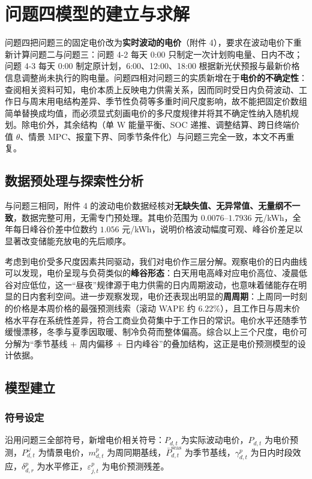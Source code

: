 \section{问题四模型的建立与求解}

问题四把问题三的固定电价改为\textbf{实时波动的电价}（附件 4），要求在波动电价下重新计算问题二与问题三：问题 4-2 每天 0:00 只制定一次计划购电量、日内不改；问题 4-3 每天 0:00 制定原计划，6:00、12:00、18:00 根据新光伏预报与最新价格信息调整尚未执行的购电量。问题四相对问题三的实质新增在于\textbf{电价的不确定性}：查阅相关资料可知，电价本质上反映电力供需关系，因而同时受日内负荷波动、工作日与周末用电结构差异、季节性负荷等多重时间尺度影响，故不能把固定价数组简单替换成均值，而必须显式刻画电价的多尺度规律并将其不确定性纳入随机规划。除电价外，其余结构（单 W 能量平衡、SOC 递推、调整结算、跨日终端价值 $\theta$、情景 MPC、报童下界、同季节条件化）与问题三完全一致，本文不再重复。

\subsection{数据预处理与探索性分析}

与问题三相同，附件 4 的波动电价数据经核对\textbf{无缺失值、无异常值、无量纲不一致}，数据完整可用，无需专门预处理。其电价范围为 $0.0076$--$1.7936$ 元/kWh，全年每日峰谷价差中位数约 $1.056$ 元/kWh，说明价格波动幅度可观、峰谷价差足以显著改变储能充放电的先后顺序。

考虑到电价受多尺度因素共同驱动，我们对电价作三层分解。观察电价的日内曲线可以发现，电价呈现与负荷类似的\textbf{峰谷形态}：白天用电高峰对应电价高位、凌晨低谷对应低位，这一“昼夜”规律源于电力供需的日内周期波动，也意味着储能存在明显的日内套利空间。进一步观察发现，电价还表现出明显的\textbf{周周期}：上周同一时刻的价格是本周价格的最强预测线索（滚动 WAPE 约 6.22\%），且工作日与周末价格水平存在系统性差异，符合工商业负荷集中于工作日的常识。电价水平还随季节缓慢漂移，冬季与夏季因取暖、制冷负荷而整体偏高。综合以上三个尺度，电价可分解为“季节基线 + 周内偏移 + 日内峰谷”的叠加结构，这正是电价预测模型的设计依据。

\subsection{模型建立}

\subsubsection{符号设定}

沿用问题三全部符号，新增电价相关符号：$P_{d,t}$ 为实际波动电价，$\widehat P_{d,t}$ 为电价预测，$P^\omega_{d,t}$ 为情景电价，$m^p_{d,t}$ 为周同期基线，$\bar P^{\mathrm{seas}}_{d,t}$ 为季节基线，$\gamma^p_{d,t}$ 为日内时段效应，$\delta^p_{d,r}$ 为水平修正，$\varepsilon^p_{j,t}$ 为电价预测残差。

